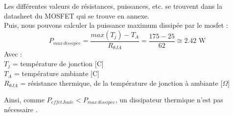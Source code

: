 Les différentes valeurs de résistances, puissances, etc. se trouvent dans la datasheet du MOSFET qui se trouve en annexe. \\

Puis, nous pouvons calculer la puissance maximum dissipée par le \gls{mosfet} :
\[P_{max\,dissip\acute{e}e} = \frac{max(T_j) - T_A}{R_{\theta JA}} = \frac{175-25}{62}\cong 2.42 \text{ W}\]
Avec :\\
$T_j$ = température de jonction [\textdegree C]\\
$T_A$ = température ambiante [\textdegree C]\\
$R_{\theta JA}$ = résistance thermique, de la température de jonction à ambiante [$\Omega$]

Ainsi, comme $P_{effetJoule} < P_{max\,dissip\acute{e}e}$, un dissipateur thermique n'est pas nécessaire \cite{addohms_mosfets_2014}. \\

